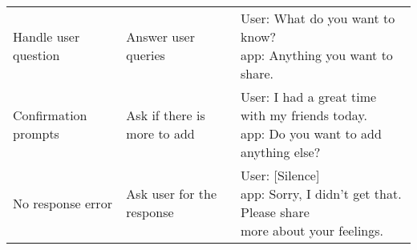 \begin{table}[t]
\begin{tabular}{p{3cm} p{4cm} p{6cm} }
        Handle user question    & Answer user queries                                       & \makecell[l]{
                                                                                                            User: What do you want to know? \\ 
                                                                                                            \acl{app}: Anything you want to share.
                                                                                                            }\\
        \rowcolor[gray]{.95}                        
        Confirmation prompts    & Ask if there is more to add                               & \makecell[l]{
                                                                                                            User: I had a great time with my friends today. \\ 
                                                                                                            \acl{app}: Do you want to add anything else?\\
                                                                                                            }\\

        
        No response error       & Ask user for the response                                 & \makecell[l]{
                                                                                                            User: [Silence] \\ 
                                                                                                            \acl{app}:  Sorry, I didn't get that. Please share \\
                                                                                                            more about your feelings.
                                                                                                            }\\
                                                                                                            

\end{tabular}
\end{table}
